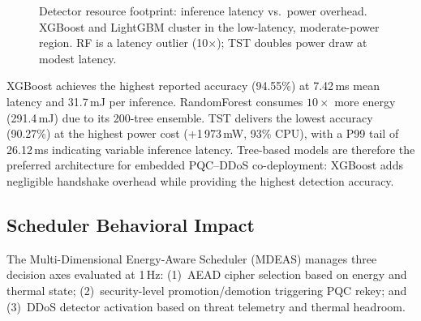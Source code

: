\begin{figure}[t]
\centering
{}
\caption{Detector resource footprint: inference latency vs.\ power
  overhead.  XGBoost and LightGBM cluster in the low-latency,
  moderate-power region.  RF is a latency outlier (10$\times$);
  TST doubles power draw at modest latency.}
\label{fig:detector_cost}
\end{figure}

XGBoost achieves the highest reported accuracy (94.55\%) at
7.42\,ms mean latency and 31.7\,mJ per inference.
RandomForest consumes $10\times$ more energy (291.4\,mJ) due to its
200-tree ensemble.  TST delivers the lowest accuracy (90.27\%) at
the highest power cost (+1\,973\,mW, 93\% CPU), with a P99 tail of
26.12\,ms indicating variable inference latency.
Tree-based models are therefore the preferred architecture for embedded
PQC--DDoS co-deployment: XGBoost adds negligible handshake overhead
while providing the highest detection accuracy.

\subsection{Scheduler Behavioral Impact}
\label{sec:scheduler}

The Multi-Dimensional Energy-Aware Scheduler (MDEAS) manages three
decision axes evaluated at 1\,Hz: (1)~AEAD cipher selection based on
energy and thermal state; (2)~security-level promotion/demotion
triggering PQC rekey; and (3)~DDoS detector activation based on
threat telemetry and thermal headroom.

